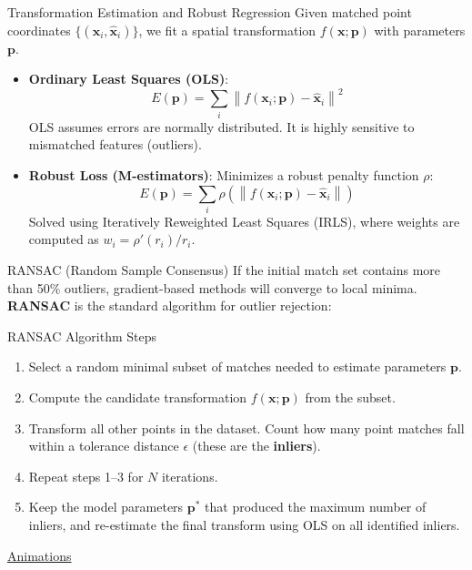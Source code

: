 \documentclass[aspectratio=169,10pt]{beamer}
\begin{document}
\begin{frame}{Transformation Estimation and Robust Regression}
Given matched point coordinates $\{(\mathbf{x}_i, \hat{\mathbf{x}}_i)\}$, we fit a spatial transformation $f(\mathbf{x};\mathbf{p})$ with parameters $\mathbf{p}$.
\begin{itemize}
    \item \textbf{Ordinary Least Squares (OLS)}:
    \[
    E(\mathbf{p}) = \sum_i \left\| f(\mathbf{x}_i; \mathbf{p}) - \hat{\mathbf{x}}_i \right\| ^2
    \]
    OLS assumes errors are normally distributed. It is highly sensitive to mismatched features (outliers).
    \item \textbf{Robust Loss (M-estimators)}: Minimizes a robust penalty function $\rho$:
    \[
    E(\mathbf{p}) = \sum_i \rho\left( \left\| f(\mathbf{x}_i; \mathbf{p}) - \hat{\mathbf{x}}_i \right\| \right)
    \]
    Solved using Iteratively Reweighted Least Squares (IRLS), where weights are computed as $w_i = \rho'(r_i)/r_i$.
\end{itemize}
\end{frame}

\begin{frame}{RANSAC (Random Sample Consensus)}
If the initial match set contains more than 50\% outliers, gradient-based methods will converge to local minima. \textbf{RANSAC} is the standard algorithm for outlier rejection:
\vfill
\begin{block}{RANSAC Algorithm Steps}
\begin{enumerate}
    \item Select a random minimal subset of matches needed to estimate parameters $\mathbf{p}$.
    \item Compute the candidate transformation $f(\mathbf{x};\mathbf{p})$ from the subset.
    \item Transform all other points in the dataset. Count how many point matches fall within a tolerance distance $\epsilon$ (these are the \textbf{inliers}).
    \item Repeat steps 1--3 for $N$ iterations.
    \item Keep the model parameters $\mathbf{p}^*$ that produced the maximum number of inliers, and re-estimate the final transform using OLS on all identified inliers.
\end{enumerate}
\end{block}
\begin{center}
\textcolor{red}{\href{https://www.youtube.com/watch?v=EkYXjmiolBg}{Animations}}
\end{center}
\end{frame}
\end{document}

